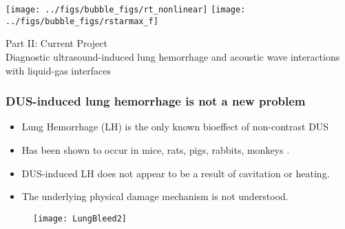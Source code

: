\begin{frame}
  \vfill

  \begin{minipage}{\textwidth}
    \texttt{[image: ../figs/bubble\_figs/rt\_nonlinear]}\hfill
    \texttt{[image: ../figs/bubble\_figs/rstarmax\_f]}  
  \end{minipage}
  \vfill
\end{frame}
\begin{frame}
  \centering
  \begin{center}
    {\LARGE Part II: Current Project}\\
    
    Diagnostic ultrasound-induced lung hemorrhage and acoustic wave
    interactions with liquid-gas interfaces
  \end{center}
\end{frame}
\begin{frame} \frametitle{\vspace*{0.5cm}DUS-induced lung hemorrhage is not a new problem}
  {\small%
    \begin{itemize}%
    \item Lung Hemorrhage (LH) is the only known bioeffect of non-contrast DUS%
    \item Has been shown to occur in mice, rats, pigs, rabbits, monkeys \citep{Child1990,OBrien1997a,Tarantal1994a}.%
    \item DUS-induced LH does not appear to be a result of cavitation or heating.%
    \item The underlying physical damage mechanism is not understood.%
    \end{itemize}%
    \begin{figure}%
      \centering%
      \texttt{[image: LungBleed2]} \nocite{Miller2012}%
    \end{figure}%
  }
\end{frame}
